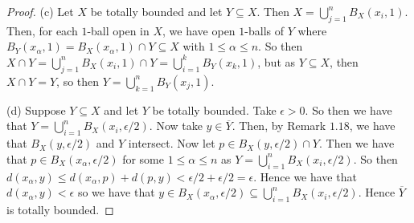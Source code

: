 \documentclass[10pt,reqno]{amsart}
\theoremstyle{definition}
\begin{document}
\begin{tcolorbox}[colback=black!5!white,colframe=black!75!black,title=  Exercise 1.15.]
\begin{proof}
(c) Let $X$ be totally bounded and let $Y \subseteq X$. Then $X = \bigcup_{j=1}^n B_X(x_i , 1)$. Then, for each $1$-ball open in $X$, we have open $1$-balls of $Y$ where $B_Y(x_\alpha , 1) = B_X(x_\alpha, 1) \cap Y \subseteq X$ with $1 \leq \alpha \leq n$. So then $X \cap Y = \bigcup_{j=1}^n B_X(x_i, 1) \cap Y = \bigcup_{i=1}^k B_Y(x_k, 1)$, but as $Y \subseteq X$, then $X \cap Y = Y$, so then $Y = \bigcup_{k=1}^n B_Y(x_j, 1)$. 

(d) Suppose $Y \subseteq X$ and let $Y$ be totally bounded. Take $\epsilon > 0$. So then we have that $Y = \bigcup_{i=1}^n B_X(x_i, \epsilon/2)$. Now take $y \in \overline{Y}$. Then, by Remark $1.18$, we have that $B_X(y, \epsilon/2)$ and $Y$ intersect. Now let $p \in B_X(y, \epsilon/2) \cap Y$. Then we have that $p \in B_X(x_\alpha, \epsilon/2)$ for some $1 \leq \alpha \leq n$ as $Y = \bigcup_{i=1}^n B_X(x_i, \epsilon/2)$. So then $d(x_\alpha, y) \leq d(x_\alpha, p) + d(p, y) < \epsilon/2+\epsilon/2 = \epsilon$. Hence we have that $d(x_\alpha, y) < \epsilon$ so we have that $ y \in B_X(x_\alpha, \epsilon/2) \subseteq \bigcup_{i=1}^n B_X(x_i,\epsilon/2)$. Hence $\overline{Y}$ is totally bounded.  
\end{proof}
\end{tcolorbox}
\end{document}
